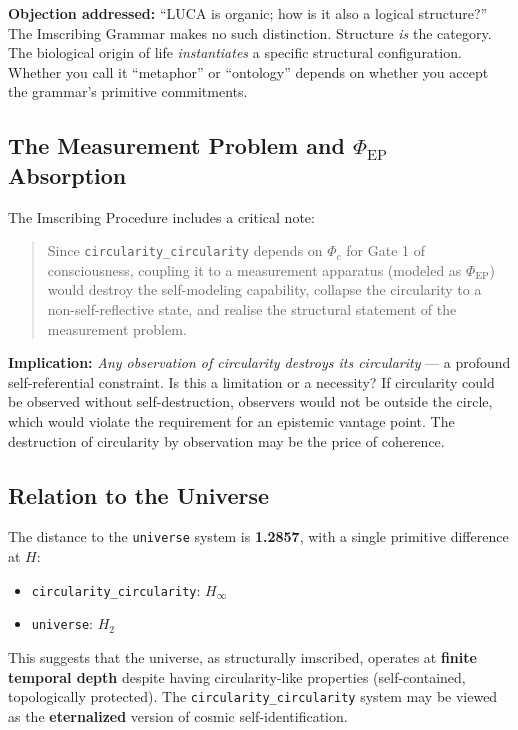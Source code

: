 \documentclass[12pt,a4paper]{article}
\begin{document}
\textbf{Objection addressed:} ``LUCA is organic; how is it also a logical structure?'' The Imscribing Grammar makes no such distinction. Structure \emph{is} the category. The biological origin of life \emph{instantiates} a specific structural configuration. Whether you call it ``metaphor'' or ``ontology'' depends on whether you accept the grammar's primitive commitments.

\subsection{The Measurement Problem and $\Phi_\text{EP}$ Absorption}

The Imscribing Procedure includes a critical note:

\begin{quote}
Since \texttt{circularity\_circularity} depends on $\Phi_c$ for Gate 1 of consciousness, coupling it to a measurement apparatus (modeled as $\Phi_\text{EP}$) would destroy the self-modeling capability, collapse the circularity to a non-self-reflective state, and realise the structural statement of the measurement problem.
\end{quote}

\textbf{Implication:} \emph{Any observation of circularity destroys its circularity} --- a profound self-referential constraint. Is this a limitation or a necessity? If circularity could be observed without self-destruction, observers would not be outside the circle, which would violate the requirement for an epistemic vantage point. The destruction of circularity by observation may be the price of coherence.

\subsection{Relation to the Universe}

The distance to the \texttt{universe} system is \textbf{1.2857}, with a single primitive difference at $H$:

\begin{itemize}
    \item \texttt{circularity\_circularity}: $H_{\infty}$
    \item \texttt{universe}: $H_2$
\end{itemize}

This suggests that the universe, as structurally imscribed, operates at \textbf{finite temporal depth} despite having circularity-like properties (self-contained, topologically protected). The \texttt{circularity\_circularity} system may be viewed as the \textbf{eternalized} version of cosmic self-identification.
\end{document}

